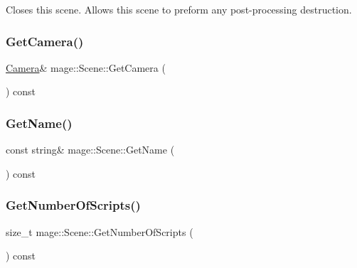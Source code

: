 Closes this scene. Allows this scene to preform any post-\/processing destruction. \hypertarget{classmage_1_1_scene_a8b2ad419541a51353d6f56ba12f43d79}{}\label{classmage_1_1_scene_a8b2ad419541a51353d6f56ba12f43d79} 
\subsubsection{\texorpdfstring{Get\+Camera()}{GetCamera()}}
{\footnotesize\ttfamily \hyperlink{classmage_1_1_camera}{Camera}\& mage\+::\+Scene\+::\+Get\+Camera (\begin{DoxyParamCaption}{ }\end{DoxyParamCaption}) const}

\hypertarget{classmage_1_1_scene_a251ff8f6ce0da5c55ee31e3450b5fb9a}{}\label{classmage_1_1_scene_a251ff8f6ce0da5c55ee31e3450b5fb9a} 
\subsubsection{\texorpdfstring{Get\+Name()}{GetName()}}
{\footnotesize\ttfamily const string\& mage\+::\+Scene\+::\+Get\+Name (\begin{DoxyParamCaption}{ }\end{DoxyParamCaption}) const}

\hypertarget{classmage_1_1_scene_a799ac8ddd90d24f6c3c208942e4f159c}{}\label{classmage_1_1_scene_a799ac8ddd90d24f6c3c208942e4f159c} 
\subsubsection{\texorpdfstring{Get\+Number\+Of\+Scripts()}{GetNumberOfScripts()}}
{\footnotesize\ttfamily size\+\_\+t mage\+::\+Scene\+::\+Get\+Number\+Of\+Scripts (\begin{DoxyParamCaption}{ }\end{DoxyParamCaption}) const}

\hypertarget{classmage_1_1_scene_aa5d10620d1cf62ba268095f7a2cd2191}{}\label{classmage_1_1_scene_aa5d10620d1cf62ba268095f7a2cd2191} 
